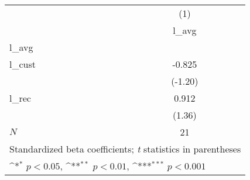 {
\def\sym#1{\ifmmode^{#1}\else\(^{#1}\)\fi}
\begin{tabular}{l*{1}{c}}
\hline\hline
            &\multicolumn{1}{c}{(1)}\\
            &\multicolumn{1}{c}{l\_avg}\\
\hline
l\_avg       &                     \\
l\_cust      &      -0.825         \\
            &     (-1.20)         \\
[1em]
l\_rec       &       0.912         \\
            &      (1.36)         \\
\hline
\(N\)       &          21         \\
\hline\hline
\multicolumn{2}{l}{\footnotesize Standardized beta coefficients; \textit{t} statistics in parentheses}\\
\multicolumn{2}{l}{\footnotesize \sym{*} \(p<0.05\), \sym{**} \(p<0.01\), \sym{***} \(p<0.001\)}\\
\end{tabular}
}
